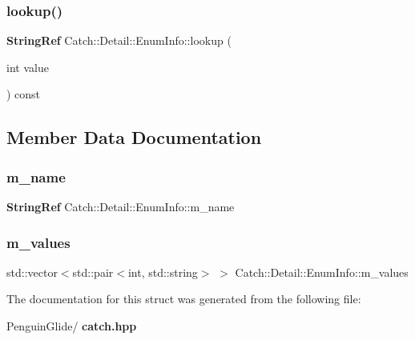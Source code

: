 \subsubsection{lookup()}
{\footnotesize\ttfamily \textbf{ String\+Ref} Catch\+::\+Detail\+::\+Enum\+Info\+::lookup (\begin{DoxyParamCaption}\item[{int}]{value }\end{DoxyParamCaption}) const}



\subsection{Member Data Documentation}
\mbox{\label{struct_catch_1_1_detail_1_1_enum_info_a16ecfd3a7e11439433aabbdf6ecb676c}} 
\subsubsection{m\_name}
{\footnotesize\ttfamily \textbf{ String\+Ref} Catch\+::\+Detail\+::\+Enum\+Info\+::m\+\_\+name}

\mbox{\label{struct_catch_1_1_detail_1_1_enum_info_a1093082858366071bae0eba1fb3c3388}} 
\subsubsection{m\_values}
{\footnotesize\ttfamily std\+::vector$<$std\+::pair$<$int, std\+::string$>$ $>$ Catch\+::\+Detail\+::\+Enum\+Info\+::m\+\_\+values}



The documentation for this struct was generated from the following file\+:\begin{DoxyCompactItemize}
\item 
Penguin\+Glide/\textbf{ catch.\+hpp}\end{DoxyCompactItemize}
